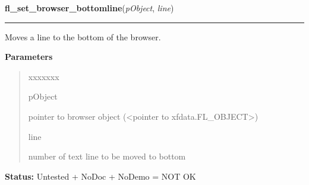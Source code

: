 \hspace{.8\funcindent}\begin{boxedminipage}{\funcwidth}

    \raggedright \textbf{fl\_set\_browser\_bottomline}(\textit{pObject}, \textit{line})

    \vspace{-1.5ex}

    \rule{\textwidth}{0.5\fboxrule}
\setlength{\parskip}{2ex}
    Moves a line to the bottom of the browser.

\setlength{\parskip}{1ex}
      \textbf{Parameters}
      \vspace{-1ex}

      \begin{quote}
        \begin{Ventry}{xxxxxxx}

          \item[pObject]

          pointer to browser object ({\textless}pointer to 
          xfdata.FL\_OBJECT{\textgreater})

          \item[line]

          number of text line to be moved to bottom

        \end{Ventry}

      \end{quote}

\textbf{Status:} Untested + NoDoc + NoDemo = NOT OK



    \end{boxedminipage}

    \label{xformslib:library:fl_set_browser_fontsize}

    \vspace{0.5ex}

